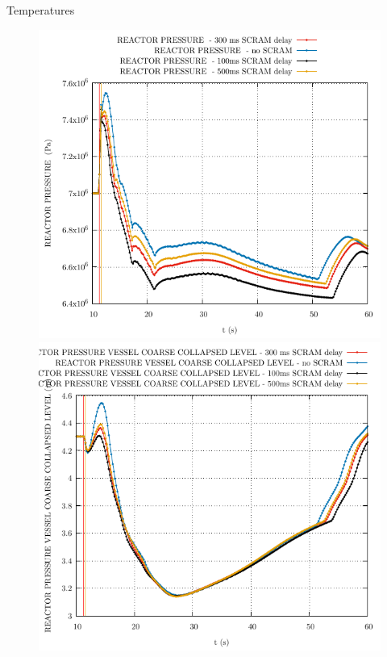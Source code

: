 \begin{frame}{Temperatures}
		\begin{figure}
		\centering
		\begin{minipage}{.5\textwidth}
			\centering
			\includegraphics[width=0.7\linewidth]{./graphs/REACTOR PRESSURE _comp.pdf}
		\end{minipage}%
		\begin{minipage}{.5\textwidth}
			\centering
			\includegraphics[width=.7\linewidth]{./graphs/REACTOR PRESSURE VESSEL COARSE COLLAPSED LEVEL_comp.pdf}
		\end{minipage}
	\end{figure}
	\vspace{-10pt}
	\begin{figure}
		\centering
		\begin{minipage}{.5\textwidth}
			\centering

\end{minipage}
\end{figure}
\end{frame}
